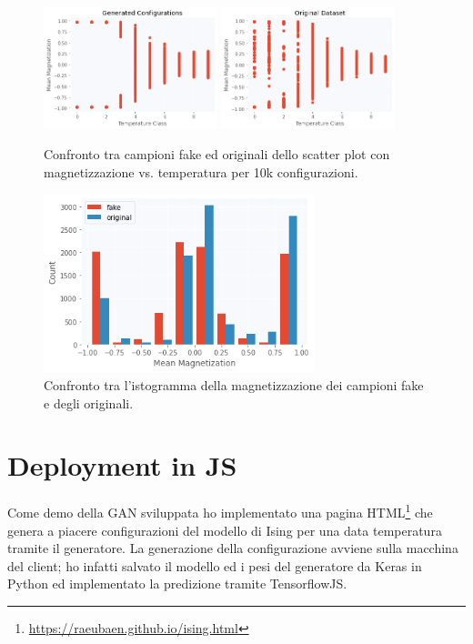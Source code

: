 \documentclass[Lau, noexaminfo, oneside]{sapthesis} %
\begin{document}
\begin{figure}[H]
\includegraphics[width=0.45\textwidth]{fakescatter.png}
\includegraphics[width=0.45\textwidth]{origscatter.png}
\centering
\caption{Confronto tra campioni fake ed originali dello scatter plot con magnetizzazione vs. temperatura per 10k configurazioni.}
\end{figure}
\begin{figure}[H]
\includegraphics[width=0.7\textwidth]{hist.png}
\centering
\caption{Confronto tra l'istogramma della magnetizzazione dei campioni fake e degli originali.}
\end{figure}
\chapter{Deployment in JS}
Come demo della GAN sviluppata ho implementato una pagina HTML\footnote{\url{https://raeubaen.github.io/ising.html}} che genera a piacere configurazioni del modello di Ising per una data temperatura tramite il generatore. La generazione della configurazione avviene sulla macchina del client; ho infatti salvato il modello ed i pesi del generatore da Keras in Python ed implementato la predizione tramite TensorflowJS. 
\newpage
\nocite{reference}
{}

\end{document}
